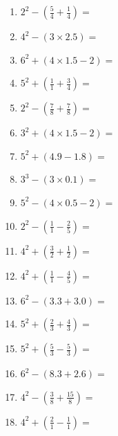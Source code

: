 \documentclass[12pt]{article}
\begin{document}
\begin{enumerate}
\newpage
\item \large $ 2^{2} - (\frac{5}{4} + \frac{1}{4}) = $ \vspace{1.4cm}
\item \large $ 4^{2} - (3 \times 2.5) = $ \vspace{1.4cm}
\item \large $ 6^{2} + (4 \times 1.5 - 2) = $ \vspace{1.4cm}
\item \large $ 5^{2} + (\frac{1}{1} + \frac{3}{4}) = $ \vspace{1.4cm}
\item \large $ 2^{2} - (\frac{7}{8} + \frac{7}{8}) = $ \vspace{1.4cm}
\item \large $ 3^{2} + (4 \times 1.5 - 2) = $ \vspace{1.4cm}
\item \large $ 5^{2} + (4.9 - 1.8) = $ \vspace{1.4cm}
\item \large $ 3^{3} - (3 \times 0.1) = $ \vspace{1.4cm}
\item \large $ 5^{2} - (4 \times 0.5 - 2) = $ \vspace{1.4cm}
\item \large $ 2^{2} - (\frac{1}{1} - \frac{2}{5}) = $ \vspace{1.4cm}
\newpage
\item \large $ 4^{2} + (\frac{3}{2} + \frac{1}{2}) = $ \vspace{1.4cm}
\item \large $ 4^{2} + (\frac{1}{1} - \frac{4}{5}) = $ \vspace{1.4cm}
\item \large $ 6^{2} - (3.3 + 3.0) = $ \vspace{1.4cm}
\item \large $ 5^{2} + (\frac{2}{3} + \frac{4}{3}) = $ \vspace{1.4cm}
\item \large $ 5^{2} + (\frac{5}{3} - \frac{5}{3}) = $ \vspace{1.4cm}
\item \large $ 6^{2} - (8.3 + 2.6) = $ \vspace{1.4cm}
\item \large $ 4^{2} - (\frac{3}{8} + \frac{15}{8}) = $ \vspace{1.4cm}
\item \large $ 4^{2} + (\frac{2}{1} - \frac{1}{1}) = $ \vspace{1.4cm}

\end{enumerate}
\end{document}
